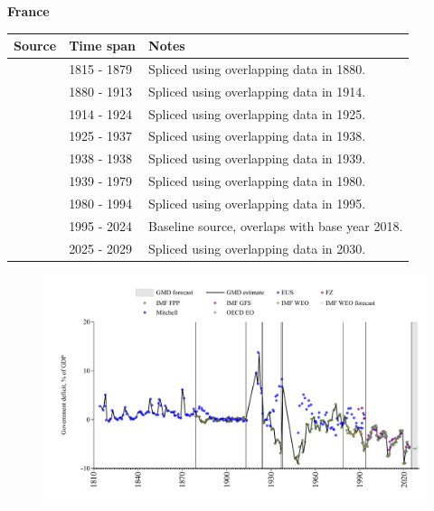 \documentclass[12pt,a4paper,landscape]{article}
\begin{document}
\begin{adjustbox}{max totalsize={\paperwidth}{\paperheight},center}
\begin{minipage}[t][\textheight][t]{\textwidth}
\vspace*{0.5cm}
{}
\begin{center}
{\Large\bfseries France}
\end{center}
\vspace{0.5cm}
\begin{table}[H]
\centering
\small
\begin{tabular}{|l|l|l|}
\hline
\textbf{Source} & \textbf{Time span} & \textbf{Notes} \\
\hline
\rowcolor{white}\cite{Mitchell}& 1815 - 1879 &Spliced using overlapping data in 1880.\\
\rowcolor{lightgray}\cite{IMF_FPP}& 1880 - 1913 &Spliced using overlapping data in 1914.\\
\rowcolor{white}\cite{Mitchell}& 1914 - 1924 &Spliced using overlapping data in 1925.\\
\rowcolor{lightgray}\cite{IMF_FPP}& 1925 - 1937 &Spliced using overlapping data in 1938.\\
\rowcolor{white}\cite{Mitchell}& 1938 - 1938 &Spliced using overlapping data in 1939.\\
\rowcolor{lightgray}\cite{IMF_FPP}& 1939 - 1979 &Spliced using overlapping data in 1980.\\
\rowcolor{white}\cite{IMF_WEO}& 1980 - 1994 &Spliced using overlapping data in 1995.\\
\rowcolor{lightgray}\cite{EUS}& 1995 - 2024 &Baseline source, overlaps with base year 2018.\\
\rowcolor{white}\cite{IMF_WEO_forecast}& 2025 - 2029 &Spliced using overlapping data in 2030.\\
\hline
\end{tabular}
\end{table}
\begin{figure}[H]
\centering
\includegraphics[width=\textwidth,height=0.6\textheight,keepaspectratio]{graphs/FRA_govdef_GDP.pdf}
\end{figure}
\end{minipage}
\end{adjustbox}
\end{document}
